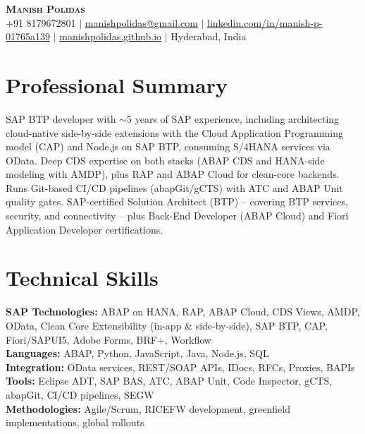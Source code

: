 \documentclass[letterpaper,11pt]{article}
\begin{document}
\begin{center}
    \textbf{\Huge \scshape Manish Polidas} \\ \vspace{1pt}
    \small +91 8179672801 $|$ \href{mailto:manishpolidas@gmail.com}{manishpolidas@gmail.com} $|$
    \href{https://www.linkedin.com/in/manish-p-01765a139/}{linkedin.com/in/manish-p-01765a139} $|$
    \href{https://manishpolidas.github.io}{manishpolidas.github.io} $|$ Hyderabad, India
\end{center}

\section{Professional Summary}
SAP BTP developer with $\sim$5 years of SAP experience, including architecting cloud-native side-by-side extensions with the Cloud Application Programming model (CAP) and Node.js on SAP BTP, consuming S/4HANA services via OData. Deep CDS expertise on both stacks (ABAP CDS and HANA-side modeling with AMDP), plus RAP and ABAP Cloud for clean-core backends. Runs Git-based CI/CD pipelines (abapGit/gCTS) with ATC and ABAP Unit quality gates. SAP-certified Solution Architect (BTP) -- covering BTP services, security, and connectivity -- plus Back-End Developer (ABAP Cloud) and Fiori Application Developer certifications.

\section{Technical Skills}
 \begin{itemize}[leftmargin=0.15in, label={}]
    \small{\item{
     \textbf{SAP Technologies:} ABAP on HANA, RAP, ABAP Cloud, CDS Views, AMDP, OData, Clean Core Extensibility (in-app \& side-by-side), SAP BTP, CAP, Fiori/SAPUI5, Adobe Forms, BRF+, Workflow \\
     \textbf{Languages:} ABAP, Python, JavaScript, Java, Node.js, SQL \\
     \textbf{Integration:} OData services, REST/SOAP APIs, IDocs, RFCs, Proxies, BAPIs \\
     \textbf{Tools:} Eclipse ADT, SAP BAS, ATC, ABAP Unit, Code Inspector, gCTS, abapGit, CI/CD pipelines, SEGW \\
     \textbf{Methodologies:} Agile/Scrum, RICEFW development, greenfield implementations, global rollouts \\
    }}
 \end{itemize}
\end{document}

